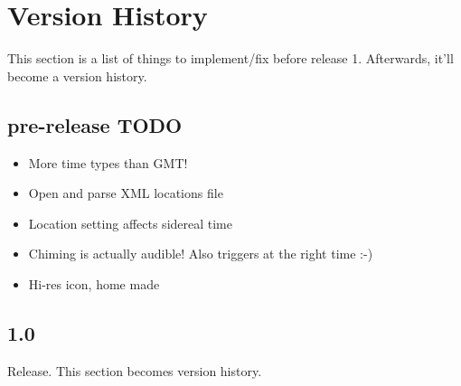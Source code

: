\section{Version History}

This section is a list of things to implement/fix before release 1. Afterwards, it'll become a version history.

\subsection{pre-release TODO}
\begin{itemize}
    \item More time types than GMT!
    \item Open and parse XML locations file
    \item Location setting affects sidereal time
    \item Chiming is actually audible! Also triggers at the right time :-)
    \item Hi-res icon, home made
\end{itemize}
\subsection{1.0}

Release. This section becomes version history.

